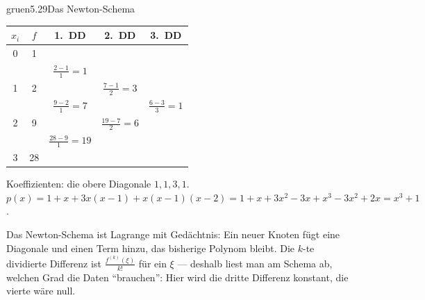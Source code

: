 \begin{loesungkarte}{gruen}{5.29}{Das Newton-Schema}
\begin{center}\small
\begin{tabular}{c|c|c|c|c}
$x_i$ & $f$ & 1.\ DD & 2.\ DD & 3.\ DD\\ \hline
0 & 1 & & & \\
 & & $\frac{2 - 1}{1} = 1$ & & \\
1 & 2 & & $\frac{7 - 1}{2} = 3$ & \\
 & & $\frac{9 - 2}{1} = 7$ & & $\frac{6 - 3}{3} = 1$\\
2 & 9 & & $\frac{19 - 7}{2} = 6$ & \\
 & & $\frac{28 - 9}{1} = 19$ & & \\
3 & 28 & & &
\end{tabular}
\end{center}
Koeffizienten: die obere Diagonale $1, 1, 3, 1$.
$p(x) = 1 + x + 3x(x - 1) + x(x - 1)(x - 2) = 1 + x + 3x^{2} - 3x + x^{3} - 3x^{2} + 2x = x^{3} + 1$.
\begin{mitnehmen}\kastentext
Das Newton-Schema ist Lagrange mit Gedächtnis: Ein neuer Knoten fügt eine Diagonale und einen Term hinzu, das bisherige Polynom bleibt. Die $k$-te dividierte Differenz ist $\frac{f^{(k)}(\xi)}{k!}$ für ein $\xi$ --- deshalb liest man am Schema ab, welchen Grad die Daten \enquote{brauchen}: Hier wird die dritte Differenz konstant, die vierte wäre null.
\end{mitnehmen}
\end{loesungkarte}

